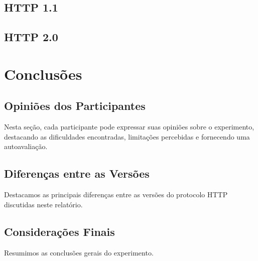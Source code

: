 \documentclass{article}
\begin{document}
\subsection{HTTP 1.1}
\subsection{HTTP 2.0}

\section{Conclusões}
\subsection{Opiniões dos Participantes}
Nesta seção, cada participante pode expressar suas opiniões sobre o
experimento, destacando as dificuldades encontradas, limitações percebidas e
fornecendo uma autoavaliação.

\subsection{Diferenças entre as Versões}
Destacamos as principais diferenças entre as versões do protocolo HTTP
discutidas neste relatório.

\subsection{Considerações Finais}
Resumimos as conclusões gerais do experimento.






\end{document}
